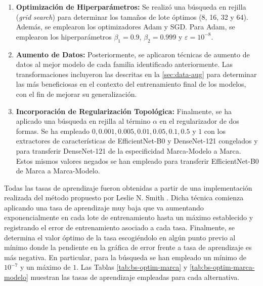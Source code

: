 \begin{enumerate}
	\item \textbf{Optimización de Hiperparámetros:} Se realizó una búsqueda en
	rejilla (\textit{grid search}) para determinar los tamaños de lote óptimos (8,
	16, 32 y 64). Además, se emplearon los optimizadores Adam y SGD. Para Adam, se
	emplearon los hiperparámetros $\beta_{1} = 0.9$, $\beta_{2} = 0.999$ y
	$\varepsilon = 10^{-8}$.
	
	\item \textbf{Aumento de Datos:} Posteriormente, se aplicaron técnicas de aumento
	de datos al mejor modelo de cada familia identificado anteriormente. Las
	transformaciones incluyeron las descritas en la \autoref{sec:data-aug} para
	determinar las más beneficiosas en el contexto del entrenamiento final de
	los modelos, con el fin de mejorar su generalización.
	
	\item \textbf{Incorporación de Regularización Topológica:} Finalmente, se ha aplicado
	una búsqueda en rejilla al término $\alpha$ en el regularizador de dos formas.
	Se ha empleado $0, 0.001, 0.005, 0.01, 0.05, 0.1, 0.5$ y $1$ con los
	extractores de características de EfficientNet-B0 y DenseNet-121 congelados
	y para transferir DenseNet-121 de la especificidad Marca-Modelo a Marca. Estos
	mismos valores negados se han empleado para transferir EfficientNet-B0 de Marca
	a Marca-Modelo.
\end{enumerate}

Todas las tasas de aprendizaje fueron obtenidas a partir de una implementación realizada
del método propuesto por Leslie N. Smith
\cite{smith2017cyclicallearningratestraining}. Dicha técnica comienza aplicando una
tasa de aprendizaje muy baja que va aumentando exponencialmente en cada lote de entrenamiento
hasta un máximo establecido y registrando el error de entrenamiento asociado a cada
tasa. Finalmente, se determina el valor óptimo de la tasa escogiéndolo en algún punto
previo al mínimo donde la pendiente en la gráfica de error frente a tasa de aprendizaje
es más negativa. En particular, para la búsqueda se han empleado un mínimo de $10
^{-7}$ y un máximo de $1$. Las Tablas \ref{tab:bs-optim-marca} y
\ref{tab:bs-optim-marca-modelo} muestran las tasas de aprendizaje empleadas para
cada alternativa.


